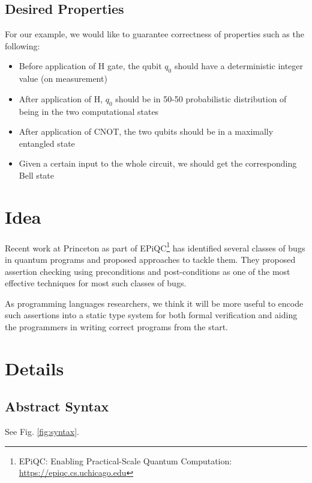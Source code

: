 \documentclass[acmsmall,nonacm]{acmart}\settopmatter{printfolios=true,printccs=false,printacmref=false}
\begin{document}
\subsection{Desired Properties}
For our example, we would like to guarantee correctness of properties such as the following:
\begin{itemize}
	\item Before application of H gate, the qubit $q_0$ should have a deterministic integer value (on measurement)
	\item After application of H, $q_0$ should be in 50-50 probabilistic distribution of being in the two computational states
	\item After application of CNOT, the two qubits should be in a maximally entangled state
	\item Given a certain input to the whole circuit, we should get the corresponding Bell state
\end{itemize}

\section{Idea}
%

Recent work at Princeton as part of EPiQC\footnote{EPiQC: Enabling Practical-Scale Quantum Computation:  \url{https://epiqc.cs.uchicago.edu}}\cite{huang2018,huang2019} has identified several classes of bugs in quantum programs and proposed approaches to tackle them. They proposed assertion checking using preconditions and post-conditions as one of the most effective techniques for most such classes of bugs.

As programming languages researchers, we think it will be more useful to encode such assertions into a static type system for both formal verification and aiding the programmers in writing correct programs from the start.

\section{Details}

\subsection{Abstract Syntax}

See Fig. \ref{fig:syntax}.
\end{document}

